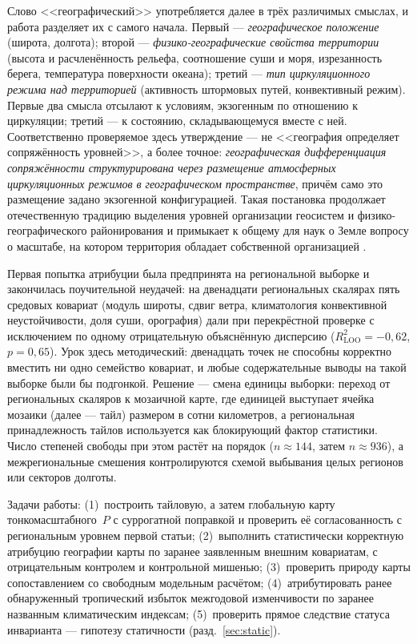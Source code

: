 \documentclass[11pt,a4paper]{article}
\begin{document}
Слово <<географический>> употребляется далее в трёх различимых смыслах, и работа разделяет их с самого начала. Первый --- \emph{географическое положение} (широта, долгота); второй --- \emph{физико-географические свойства территории} (высота и расчленённость рельефа, соотношение суши и моря, изрезанность берега, температура поверхности океана); третий --- \emph{тип циркуляционного режима над территорией} (активность штормовых путей, конвективный режим). Первые два смысла отсылают к условиям, экзогенным по отношению к циркуляции; третий --- к состоянию, складывающемуся вместе с ней. Соответственно проверяемое здесь утверждение --- не <<география определяет сопряжённость уровней>>, а более точное: \emph{географическая дифференциация сопряжённости структурирована через размещение атмосферных циркуляционных режимов в географическом пространстве}, причём само это размещение задано экзогенной конфигурацией. Такая постановка продолжает отечественную традицию выделения уровней организации геосистем и физико-географического районирования \cite{Sochava1978,Isachenko1991,Bertrand1968} и примыкает к общему для наук о Земле вопросу о масштабе, на котором территория обладает собственной организацией \cite{Simon1962,Levin1992,WuLoucks1995}.

Первая попытка атрибуции была предпринята на региональной выборке и закончилась поучительной неудачей: на двенадцати региональных скалярах пять средовых ковариат (модуль широты, сдвиг ветра, климатология конвективной неустойчивости, доля суши, орография) дали при перекрёстной проверке с исключением по одному отрицательную объяснённую дисперсию ($R^2_{\mathrm{LOO}}=-0{,}62$, $p=0{,}65$). Урок здесь методический: двенадцать точек не способны корректно вместить ни одно семейство ковариат, и любые содержательные выводы на такой выборке были бы подгонкой. Решение --- смена единицы выборки: переход от региональных скаляров к мозаичной карте, где единицей выступает ячейка мозаики (далее --- тайл) размером в сотни километров, а региональная принадлежность тайлов используется как блокирующий фактор статистики. Число степеней свободы при этом растёт на порядок ($n\approx144$, затем $n\approx936$), а межрегиональные смешения контролируются схемой выбывания целых регионов или секторов долготы.

Задачи работы: (1)~построить тайловую, а затем глобальную карту тонкомасштабного~$P$ с суррогатной поправкой и проверить её согласованность с региональным уровнем первой статьи; (2)~выполнить статистически корректную атрибуцию географии карты по заранее заявленным внешним ковариатам, с отрицательным контролем и контрольной мишенью; (3)~проверить природу карты сопоставлением со свободным модельным расчётом; (4)~атрибутировать ранее обнаруженный тропический избыток межгодовой изменчивости по заранее названным климатическим индексам; (5)~проверить прямое следствие статуса инварианта --- гипотезу статичности (разд.~\ref{sec:static}).
\end{document}
